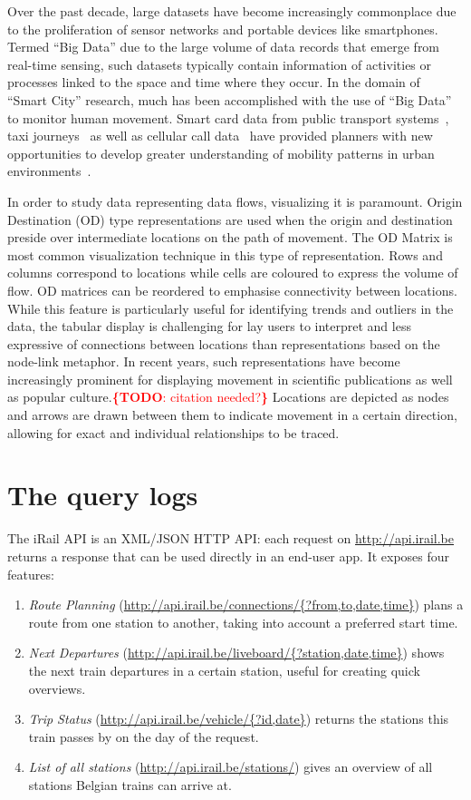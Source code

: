 \documentclass{sig-alternate}
\newcommand{\todo}[1]{\noindent\textcolor{red}{{\bf \{TODO}: #1{\bf \}}}}
\begin{document}
Over the past decade, large datasets have become increasingly commonplace due to the proliferation of sensor networks and portable devices like smartphones.
Termed ``Big Data'' due to the large volume of data records that emerge from real-time sensing\cite{kitchin}, such datasets typically contain information of activities or processes linked to the space and time where they occur.
In the domain of ``Smart City'' research, much has been accomplished with the use of ``Big Data'' to monitor human movement.
Smart card data from public transport systems~\cite{roth,beecham}, taxi journeys~\cite{ferreira} as well as cellular call data~\cite{sevtsuk} have provided planners with new opportunities to develop greater understanding of mobility patterns in urban environments~\cite{batty}.

In order to study data representing data flows, visualizing it is paramount.
Origin Destination (OD) type representations are used when the origin and destination preside over intermediate locations on the path of movement. 
The OD Matrix is most common visualization technique in this type of representation. 
Rows and columns correspond to locations while cells are coloured to express the volume of flow.
OD matrices can be reordered to emphasise connectivity between locations.
While this feature is particularly useful for identifying trends and outliers in the data, the tabular display is challenging for lay users to interpret and less expressive of connections between locations than representations based on the node-link metaphor.
In recent years, such representations have become increasingly prominent for displaying movement in scientific publications as well as popular culture.\todo{citation needed?}
Locations are depicted as nodes and arrows are drawn between them to indicate movement in a certain direction, allowing for exact and individual relationships to be traced.

\section{The query logs}
\label{sec:logs}

The iRail API is an XML/JSON HTTP API: each request on \url{http://api.irail.be} returns a response that can be used directly in an end-user app.
It exposes four features: 
\begin{enumerate}
\item \emph{Route Planning} (\url{http://api.irail.be/connections/{?from,to,date,time}}) plans a route from one station to another, taking into account a preferred start time.
\item \emph{Next Departures} (\url{http://api.irail.be/liveboard/{?station,date,time}}) shows the next train departures in a certain station, useful for creating quick overviews.
\item \emph{Trip Status} (\url{http://api.irail.be/vehicle/{?id,date}}) returns the stations this train passes by on the day of the request.
\item \emph{List of all stations} (\url{http://api.irail.be/stations/}) gives an overview of all stations Belgian trains can arrive at.
\end{enumerate}
\end{document}

